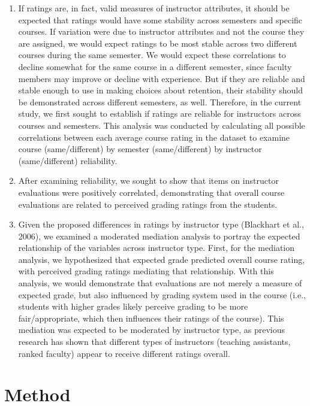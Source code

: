 \documentclass[,man]{apa6}
\theoremstyle{definition}
\theoremstyle{definition}
\theoremstyle{definition}
\theoremstyle{remark}
\begin{document}
\begin{enumerate}
\def\labelenumi{\arabic{enumi})}
\item
  If ratings are, in fact, valid measures of instructor attributes, it
  should be expected that ratings would have some stability across
  semesters and specific courses. If variation were due to instructor
  attributes and not the course they are assigned, we would expect
  ratings to be most stable across two different courses during the same
  semester. We would expect these correlations to decline somewhat for
  the same course in a different semester, since faculty members may
  improve or decline with experience. But if they are reliable and
  stable enough to use in making choices about retention, their
  stability should be demonstrated across different semesters, as well.
  Therefore, in the current study, we first sought to establish if
  ratings are reliable for instructors across courses and semesters.
  This analysis was conducted by calculating all possible correlations
  between each average course rating in the dataset to examine course
  (same/different) by semester (same/different) by instructor
  (same/different) reliability.
\item
  After examining reliability, we sought to show that items on
  instructor evaluations were positively correlated, demonstrating that
  overall course evaluations are related to perceived grading ratings
  from the students.
\item
  Given the proposed differences in ratings by instructor type
  (Blackhart et al., 2006), we examined a moderated mediation analysis
  to portray the expected relationship of the variables across
  instructor type. First, for the mediation analysis, we hypothesized
  that expected grade predicted overall course rating, with perceived
  grading ratings mediating that relationship. With this analysis, we
  would demonstrate that evaluations are not merely a measure of
  expected grade, but also influenced by grading system used in the
  course (i.e., students with higher grades likely perceive grading to
  be more fair/appropriate, which then influences their ratings of the
  course). This mediation was expected to be moderated by instructor
  type, as previous research has shown that different types of
  instructors (teaching assistants, ranked faculty) appear to receive
  different ratings overall.
\end{enumerate}

\hypertarget{method}{%
\section{Method}\label{method}}
\end{document}
